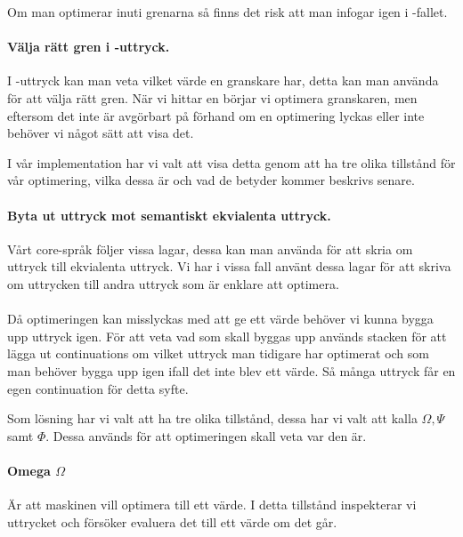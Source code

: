 \documentclass[Rapport]{subfiles}
\begin{document}
Om man optimerar  inuti grenarna så finns det risk att man infogar 
igen i -fallet.

\paragraph{ Välja rätt gren i -uttryck. }

I -uttryck kan man veta vilket värde en granskare har, detta kan man använda
för att välja rätt gren. När vi hittar en  börjar vi optimera granskaren,
men eftersom det inte är avgörbart på förhand om en optimering lyckas eller inte
behöver vi något sätt att visa det. 

I vår implementation har vi valt att visa detta genom att ha tre olika tillstånd
för vår optimering, vilka dessa är och vad de betyder kommer beskrivs senare.

\paragraph{ Byta ut uttryck mot semantiskt ekvialenta uttryck.}

Vårt core-språk följer vissa lagar, dessa kan man använda för att skria om uttryck
till ekvialenta uttryck. Vi har i vissa fall använt dessa lagar för att skriva om
uttrycken till andra uttryck som är enklare att optimera.

\paragraph{}

Då optimeringen kan misslyckas med att ge ett värde behöver vi kunna bygga upp uttryck
igen. För att veta vad som skall byggas upp används stacken för att lägga ut continuations
om vilket uttryck man tidigare har optimerat och som man behöver bygga upp igen ifall det
inte blev ett värde. Så många uttryck får en egen continuation för detta syfte.



Som lösning har vi valt att ha tre olika tillstånd, dessa har vi valt att kalla
$\Omega, \Psi$ samt $\Phi$. Dessa används för att optimeringen skall veta var den
är. 

\paragraph{Omega $\Omega$} Är att maskinen vill optimera till ett värde. I detta tillstånd
inspekterar vi uttrycket och försöker evaluera det till ett värde om det går.
\end{document}
